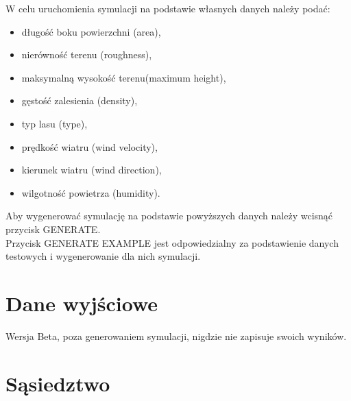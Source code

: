 \documentclass[a4paper, 11pt]{article}
\begin{document}
	\hfill%
	\begin{minipage}{0.5\textwidth}\raggedright
		
		W celu uruchomienia symulacji na podstawie własnych danych należy podać:
		\begin{itemize}
			\item długość boku powierzchni (area),
			\item nierówność terenu (roughness),
			\item maksymalną wysokość terenu(maximum height),
			\item gęstość zalesienia (density),
			\item typ lasu (type),
			\item prędkość wiatru (wind velocity),
			\item kierunek wiatru (wind direction),
			\item wilgotność powietrza (humidity).
		\end{itemize}
		Aby wygenerować symulację na podstawie powyższych danych należy wcisnąć przycisk GENERATE.\\
		Przycisk GENERATE EXAMPLE jest odpowiedzialny za podstawienie danych testowych i wygenerowanie dla nich symulacji.
	\end{minipage}
	
	
	\section*{Dane wyjściowe}
	\indent
	
	Wersja Beta, poza generowaniem symulacji, nigdzie nie zapisuje swoich wyników.
	
	\section*{Sąsiedztwo}
	\indent	
	
\end{document}
